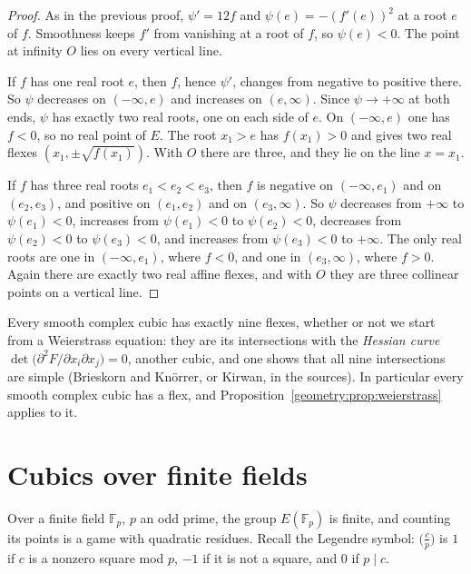 \begin{proof}
As in the previous proof, $\psi'=12f$ and $\psi(e)=-(f'(e))^2$ at a root $e$ of $f$. Smoothness keeps $f'$ from vanishing at a root of $f$, so $\psi(e)<0$. The point at infinity $O$ lies on every vertical line.

If $f$ has one real root $e$, then $f$, hence $\psi'$, changes from negative to positive there. So $\psi$ decreases on $(-\infty,e)$ and increases on $(e,\infty)$. Since $\psi\to+\infty$ at both ends, $\psi$ has exactly two real roots, one on each side of $e$. On $(-\infty,e)$ one has $f<0$, so no real point of $E$. The root $x_1>e$ has $f(x_1)>0$ and gives two real flexes $(x_1,\pm\sqrt{f(x_1)})$. With $O$ there are three, and they lie on the line $x=x_1$.

If $f$ has three real roots $e_1<e_2<e_3$, then $f$ is negative on $(-\infty,e_1)$ and on $(e_2,e_3)$, and positive on $(e_1,e_2)$ and on $(e_3,\infty)$. So $\psi$ decreases from $+\infty$ to $\psi(e_1)<0$, increases from $\psi(e_1)<0$ to $\psi(e_2)<0$, decreases from $\psi(e_2)<0$ to $\psi(e_3)<0$, and increases from $\psi(e_3)<0$ to $+\infty$. The only real roots are one in $(-\infty,e_1)$, where $f<0$, and one in $(e_3,\infty)$, where $f>0$. Again there are exactly two real affine flexes, and with $O$ they are three collinear points on a vertical line.
\end{proof}

\begin{remark}
Every smooth complex cubic has exactly nine flexes, whether or not we start from a Weierstrass equation: they are its intersections with the
\emph{Hessian curve} $\det\bigl(\partial^2F/\partial x_i\partial x_j\bigr)=0$, another cubic, and one shows that all nine intersections are simple (Brieskorn
and Kn\"orrer, or Kirwan, in the sources). In particular every smooth complex cubic has a flex, and Proposition~\ref{geometry:prop:weierstrass} applies to it.
\end{remark}

\section{Cubics over finite fields}

Over a finite field $\mathbb F_p$, $p$ an odd prime, the group $E(\mathbb F_p)$ is finite, and counting its points is a game with quadratic residues.
Recall the Legendre symbol: $\bigl(\frac cp\bigr)$ is $1$ if $c$ is a nonzero square mod $p$, $-1$ if it is not a square, and $0$ if $p\mid c$.

